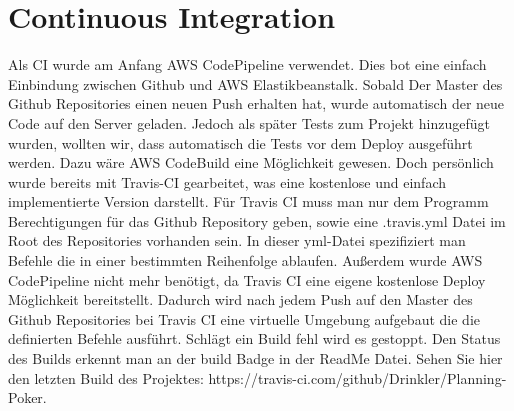 \chapter{Continuous Integration}\label{ch:continuous-integration}
Als CI wurde am Anfang AWS CodePipeline verwendet. Dies bot eine einfach Einbindung zwischen Github und AWS Elastikbeanstalk. Sobald Der Master des Github Repositories einen neuen Push erhalten hat, wurde automatisch der neue Code auf den Server geladen. Jedoch als später Tests zum Projekt hinzugefügt wurden, wollten wir, dass automatisch die Tests vor dem Deploy ausgeführt werden. Dazu wäre AWS CodeBuild eine Möglichkeit gewesen. Doch persönlich wurde bereits mit Travis-CI gearbeitet, was eine kostenlose und einfach implementierte Version darstellt. Für Travis CI muss man nur dem Programm Berechtigungen für das Github Repository geben, sowie eine .travis.yml Datei im Root des Repositories vorhanden sein. In dieser yml-Datei spezifiziert man Befehle die in einer bestimmten Reihenfolge ablaufen. Außerdem wurde AWS CodePipeline nicht mehr benötigt, da Travis CI eine eigene kostenlose Deploy Möglichkeit bereitstellt.
Dadurch wird nach jedem Push auf den Master des Github Repositories bei Travis CI eine virtuelle Umgebung aufgebaut die die definierten Befehle ausführt. Schlägt ein Build fehl wird es gestoppt. Den Status des Builds erkennt man an der build Badge in der ReadMe Datei. Sehen Sie hier den letzten Build des Projektes: https://travis-ci.com/github/Drinkler/Planning-Poker.